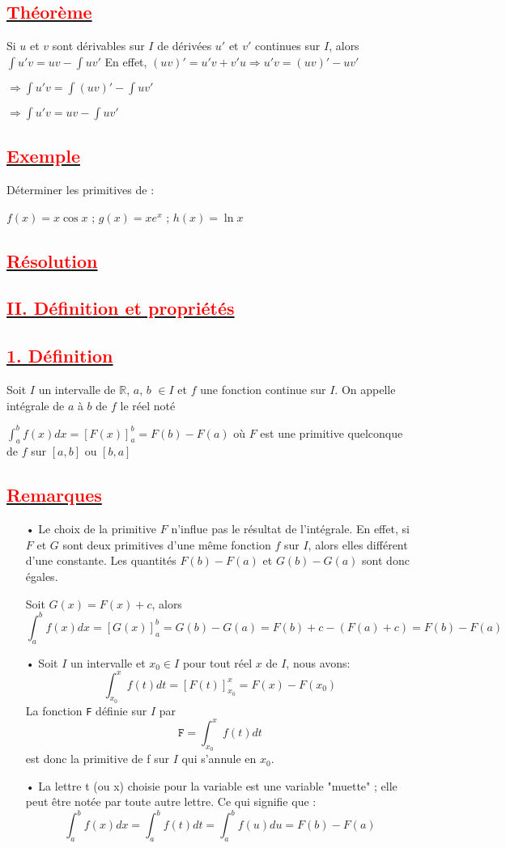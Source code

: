 \documentclass[12pt]{article}
\begin{document}
\subsection*{\underline{\textbf{\textcolor{red}{Théorème }}}}
Si $u$ et $v$ sont dérivables sur $I$ de dérivées $u'$ et $v'$ continues sur $I$, alors
$\int u'v=uv-\int uv'$ En effet, $(uv)'=u'v+v'u \Longrightarrow u'v=(uv)'-uv'$

$\Longrightarrow \int u'v=\int (uv)'-\int uv'$ 

$\Longrightarrow \int u'v=uv-\int uv'$ 
\subsection*{\underline{\textbf{\textcolor{red}{Exemple}}}}
Déterminer les primitives de :

$f(x)=x\cos x$ ; $g(x)=xe^{x}$ ; $h(x)=\ln x$
\subsection*{\underline{\textbf{\textcolor{red}{Résolution }}}}
\subsection*{\underline{\textbf{\textcolor{red}{II. Définition et propriétés}}}}
\subsection*{\underline{\textbf{\textcolor{red}{1. Définition }}}}
Soit $I$ un intervalle de $\mathbb{R}$, $a$, $b$ $\in I$ et $f$ une fonction continue sur $I$. On appelle intégrale de $a$ à $b$ de $f$ le réel noté

$\int_{a}^{b}f(x)dx=[F(x)]_{a}^{b}=F(b)-F(a)$ où $F$ est une primitive quelconque de $f$ sur 
$[a,b]$ ou $[b,a]$
\subsection*{\underline{\textbf{\textcolor{red}{Remarques }}}}
\begin{itemize}
\item[•] Le choix de la primitive $F$ n'influe pas le résultat de l'intégrale. En effet, si $F$ et $G$ sont deux primitives d'une même fonction $f$ sur $I$, alors elles différent d'une constante. Les quantités $F(b)-F(a)$ et $G(b)-G(a)$ sont donc égales.

Soit $G(x)=F(x)+c$, alors \[\int_{a}^{b}f(x)dx=[G(x)]_{a}^{b}
=G(b)-G(a)=F(b)+c-(F(a)+c)=F(b)-F(a)\]
\item[•] Soit $I$ un intervalle et $x_{0}\in I$ pour tout réel $x$ de $I$, nous avons:
		\[\int_{x_{0}}^{x}f(t)dt=[F(t)]_{x_{0}}^{x}=F(x)-F(x_{0})\]
La fonction \texttt{F} définie sur $I$ par \[\texttt{F}=\int_{x_{0}}^{x}f(t)dt\]
est donc la primitive de f sur $I$ qui s'annule en $x_{0}$.
\item[•] La lettre t (ou x) choisie pour la variable est une variable "muette" ; elle peut être notée par toute autre lettre. Ce qui signifie que :
\[\int_{a}^{b}f(x)dx=\int_{a}^{b}f(t)dt=\int_{a}^{b}f(u)du=F(b)-F(a) \]
\end{itemize}
\end{document}

